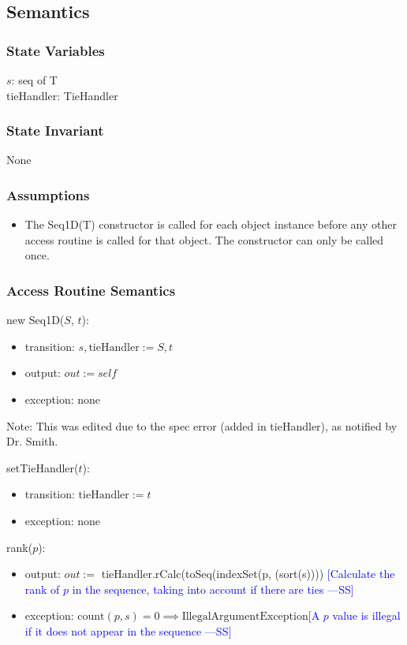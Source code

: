 \documentclass[12pt,fleqn]{examtst}
\newcommand{\authornote}[3]{\textcolor{#1}{[#3 ---#2]}}
\newcommand{\authornote}[3]{}
\newcommand{\wss}[1]{\authornote{blue}{SS}{#1}}
\begin{document}
\subsection* {Semantics}

\subsubsection* {State Variables}

$s$: seq of T\\
tieHandler: TieHandler

\subsubsection* {State Invariant}

None

\subsubsection* {Assumptions}

\begin{itemize}
\item The Seq1D(T) constructor is called for each object instance before any
other access routine is called for that object.  The constructor can only be
called once.
\end{itemize}

\subsubsection* {Access Routine Semantics}

new Seq1D($S$, $t$):
\begin{itemize}
\item transition: $s, \mbox{tieHandler} := S, t$
\item output: $\mathit{out} := \mathit{self}$
\item exception: none
\end{itemize}
Note: This was edited due to the spec error (added in \mbox{tieHandler}), as notified by Dr. Smith.

\noindent setTieHandler($t$):
\begin{itemize}
\item transition: $\mbox{tieHandler} := t$
\item exception: none
\end{itemize}

\noindent rank($p$):
\begin{itemize}
\item output: $out :=$ \mbox{tieHandler}.rCalc(toSeq(indexSet(p, (sort(s)))) \wss{Calculate the rank of $p$ in the sequence, taking into
    account if there are ties}
\item exception: $\mbox{count}(p,s) = 0 \implies \mbox{IllegalArgumentException}$\wss{A $p$ value is illegal if it does not appear in the
    sequence}
\end{itemize}
\end{document}
